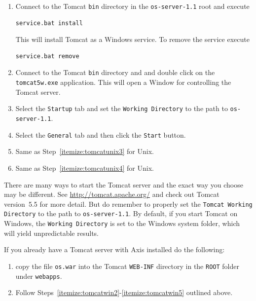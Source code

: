 \documentclass[11pt]{article}
\renewcommand{\_}{{\char"5F}}
\renewcommand{\{}{{\char"7B}}
\renewcommand{\}}{{\char"7D}}
\renewcommand{\^}{{\char"0D}}
\renewcommand{\'}{{\char"0D}}
\begin{document}
\begin{enumerate}[Step 1:]
\begin{enumerate}[Step 1.]
\item{} \label{itemize:tomcatwin2}  Connect to the Tomcat {\tt bin} directory in the {\tt os-server-1.1} root and execute
\begin{verbatim}
service.bat install
\end{verbatim}
This will install Tomcat as a Windows service.  To remove the service execute
\begin{verbatim}
service.bat remove
\end{verbatim}

\item{}  \label{itemize:tomcatwin3}  Connect to the Tomcat {\tt bin} directory and and double click on the 
{\tt tomcat5w.exe} application.  This will open a Window for controlling the Tomcat server.

\item{}  \label{itemize:tomcatwin4} Select the {\tt Startup} tab and set the {\tt Working Directory} 
to the path to {\tt os-server-1.1}.

\item{}  \label{itemize:tomcatwin5} Select the {\tt General} tab and then click the {\tt Start} button.

\item{}  Same as Step~\ref{itemize:tomcatunix3} for Unix.

\item{}  Same as Step~\ref{itemize:tomcatunix4} for Unix.

\end{enumerate}

\vskip 8pt

There are many ways to start the Tomcat server and the exact way you choose may be different. 
See \url{http://tomcat.apache.org/} and check out Tomcat version~5.5 for more detail. But do remember to 
properly set the {\tt Tomcat Working Directory} to the path to {\tt os-server-1.1}. By default, 
if you start Tomcat on Windows, the {\tt Working Directory} is set to the Windows system folder, 
which will yield unpredictable results.

\vskip 8pt

If you already have a Tomcat server with Axis installed do the following:
\begin{enumerate}
\item{} copy the file {\tt os.war} into the Tomcat {\tt WEB-INF} directory in the {\tt ROOT} folder under {\tt webapps}.

\item{}  Follow Steps~\ref{itemize:tomcatwin2}-\ref{itemize:tomcatwin5} outlined above.
\end{enumerate}


\end{enumerate}
\end{document}
